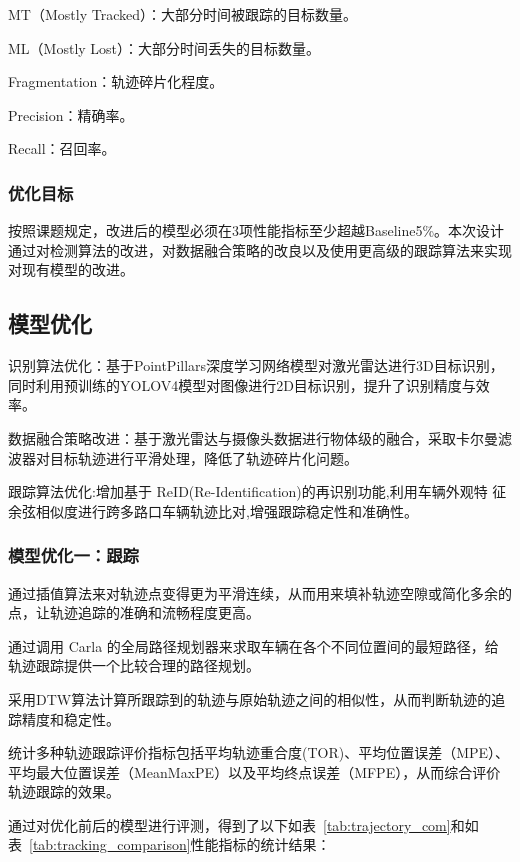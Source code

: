MT（Mostly Tracked）：大部分时间被跟踪的目标数量。

ML（Mostly Lost）：大部分时间丢失的目标数量。

Fragmentation：轨迹碎片化程度。

Precision：精确率。

Recall：召回率。
\subsubsection{优化目标}


按照课题规定，改进后的模型必须在3项性能指标至少超越Baseline5\%。本次设计通过对检测算法的改进，对数据融合策略的改良以及使用更高级的跟踪算法来实现对现有模型的改进。







\subsection{模型优化}

识别算法优化：基于PointPillars深度学习网络模型对激光雷达进行3D目标识别，同时利用预训练的YOLOV4模型对图像进行2D目标识别，提升了识别精度与效率。


数据融合策略改进：基于激光雷达与摄像头数据进行物体级的融合，采取卡尔曼滤波器对目标轨迹进行平滑处理，降低了轨迹碎片化问题。


跟踪算法优化:增加基于 ReID(Re-Identification)的再识别功能,利用车辆外观特 征余弦相似度进行跨多路口车辆轨迹比对,增强跟踪稳定性和准确性。

\subsubsection{模型优化一：跟踪}

通过插值算法来对轨迹点变得更为平滑连续，从而用来填补轨迹空隙或简化多余的点，让轨迹追踪的准确和流畅程度更高。

通过调用 Carla 的全局路径规划器来求取车辆在各个不同位置间的最短路径，给轨迹跟踪提供一个比较合理的路径规划。

采用DTW算法计算所跟踪到的轨迹与原始轨迹之间的相似性，从而判断轨迹的追踪精度和稳定性。

统计多种轨迹跟踪评价指标包括平均轨迹重合度(TOR)、平均位置误差（MPE）、平均最大位置误差（MeanMaxPE）以及平均终点误差（MFPE），从而综合评价轨迹跟踪的效果。

通过对优化前后的模型进行评测，得到了以下如表~\ref{tab:trajectory_com}和如表~\ref{tab:tracking_comparison}性能指标的统计结果：

